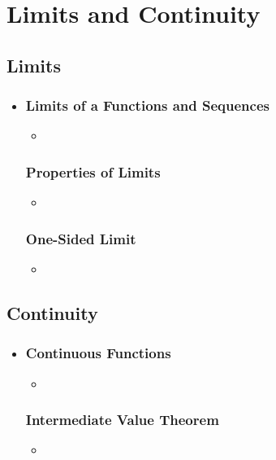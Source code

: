 \chapter{Limits and Continuity}

\section{Limits}
\begin{itemize}
  \item []

  \subsection{Limits of a Functions and Sequences}
  \begin{itemize}
    \item
  \end{itemize}


  \subsection{Properties of Limits}
  \begin{itemize}
    \item
  \end{itemize}

  \subsection{One-Sided Limit}
  \begin{itemize}
    \item
  \end{itemize}
\end{itemize}

\section{Continuity}
\begin{itemize}
  \item []

  \subsection{Continuous Functions}
  \begin{itemize}
    \item
  \end{itemize}

  \subsection{Intermediate Value Theorem}
  \begin{itemize}
    \item
  \end{itemize}

\end{itemize}


